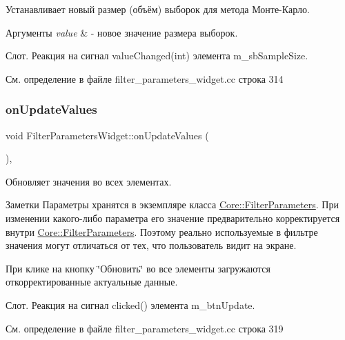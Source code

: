 Устанавливает новый размер (объём) выборок для метода Монте-\/Карло. 


\begin{DoxyParams}{Аргументы}
{\em value} & -\/ новое значение размера выборок.\\
\hline
\end{DoxyParams}
Слот. Реакция на сигнал value\+Changed(int) элемента m\+\_\+sb\+Sample\+Size. 

См. определение в файле filter\+\_\+parameters\+\_\+widget.\+cc строка 314

\hypertarget{class_filter_parameters_widget_ad952425cf2dabf76a2f28d19caa2641f}{}\label{class_filter_parameters_widget_ad952425cf2dabf76a2f28d19caa2641f} 
\subsubsection{\texorpdfstring{on\+Update\+Values}{onUpdateValues}}
{\footnotesize\ttfamily void Filter\+Parameters\+Widget\+::on\+Update\+Values (\begin{DoxyParamCaption}{ }\end{DoxyParamCaption})\hspace{0.3cm}{\ttfamily [private]}, {\ttfamily [slot]}}



Обновляет значения во всех элементах. 

\begin{DoxyNote}{Заметки}
Параметры хранятся в экземпляре класса \hyperlink{class_core_1_1_filter_parameters}{Core\+::\+Filter\+Parameters}. При изменении какого-\/либо параметра его значение предварительно корректируется внутри \hyperlink{class_core_1_1_filter_parameters}{Core\+::\+Filter\+Parameters}. Поэтому реально используемые в фильтре значения могут отличаться от тех, что пользователь видит на экране.
\end{DoxyNote}
При клике на кнопку \char`\"{}Обновить\char`\"{} во все элементы загружаются откорректированные актуальные данные.

Слот. Реакция на сигнал clicked() элемента m\+\_\+btn\+Update. 

См. определение в файле filter\+\_\+parameters\+\_\+widget.\+cc строка 319

\hypertarget{class_filter_parameters_widget_afca68a62342f0aa6be9133df55134993}{}\label{class_filter_parameters_widget_afca68a62342f0aa6be9133df55134993} 
